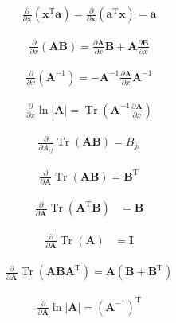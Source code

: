 \documentclass{article}
\begin{document}
\begin{align*}
\frac{\partial}{\partial \mathbf{x}}\left(\mathbf{x}^{\mathrm{T}} \mathbf{a}\right) = \frac{\partial}{\partial \mathbf{x}}\left(\mathbf{a}^{\mathrm{T}} \mathbf{x}\right) = \mathbf{a}
\tag{A.19}
\end{align*}

\begin{align*}
\frac{\partial}{\partial x}(\mathbf{A B}) = \frac{\partial \mathbf{A}}{\partial x} \mathbf{B} + \mathbf{A} \frac{\partial \mathbf{B}}{\partial x}
\tag{A.20}
\end{align*}

\begin{align*}
\frac{\partial}{\partial x}\left(\mathbf{A}^{-1}\right) = -\mathbf{A}^{-1} \frac{\partial \mathbf{A}}{\partial x} \mathbf{A}^{-1}
\tag{A.21}
\end{align*}

\begin{align*}
\frac{\partial}{\partial x} \ln |\mathbf{A}| = \operatorname{Tr}\left(\mathbf{A}^{-1} \frac{\partial \mathbf{A}}{\partial x}\right)
\tag{A.22}
\end{align*}

\begin{align*}
\frac{\partial}{\partial A_{i j}} \operatorname{Tr}(\mathbf{A B}) = B_{j i}
\tag{A.23}
\end{align*}

\begin{align*}
\frac{\partial}{\partial \mathbf{A}} \operatorname{Tr}(\mathbf{A B}) = \mathbf{B}^{\mathrm{T}}
\tag{A.24}
\end{align*}

\begin{align*}
\frac{\partial}{\partial \mathbf{A}} \operatorname{Tr}\left(\mathbf{A}^{\mathrm{T}} \mathbf{B}\right) & = \mathbf{B}
\tag{A.25}
\end{align*}

\begin{align*}
\frac{\partial}{\partial \mathbf{A}} \operatorname{Tr}(\mathbf{A}) & = \mathbf{I}
\tag{A.26}
\end{align*}

\begin{align*}
\frac{\partial}{\partial \mathbf{A}} \operatorname{Tr}\left(\mathbf{A B} \mathbf{A}^{\mathrm{T}}\right) = \mathbf{A}\left(\mathbf{B} + \mathbf{B}^{\mathrm{T}}\right)
\tag{A.27}
\end{align*}

\begin{align*}
\frac{\partial}{\partial \mathbf{A}} \ln |\mathbf{A}| = \left(\mathbf{A}^{-1}\right)^{\mathrm{T}}
\tag{A.28}
\end{align*}
\end{document}
